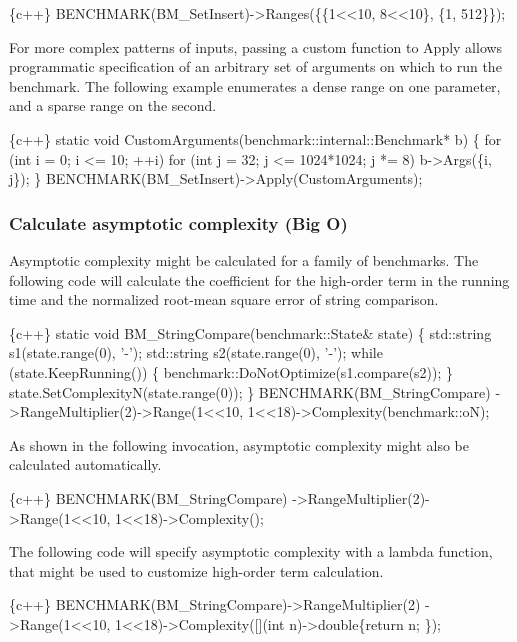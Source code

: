 \begin{DoxyCode}
\{c++\}
BENCHMARK(BM\_SetInsert)->Ranges(\{\{1<<10, 8<<10\}, \{1, 512\}\});
\end{DoxyCode}


For more complex patterns of inputs, passing a custom function to {\ttfamily Apply} allows programmatic specification of an arbitrary set of arguments on which to run the benchmark. The following example enumerates a dense range on one parameter, and a sparse range on the second.


\begin{DoxyCode}
\{c++\}
static void CustomArguments(benchmark::internal::Benchmark* b) \{
  for (int i = 0; i <= 10; ++i)
    for (int j = 32; j <= 1024*1024; j *= 8)
      b->Args(\{i, j\});
\}
BENCHMARK(BM\_SetInsert)->Apply(CustomArguments);
\end{DoxyCode}


\subsubsection*{Calculate asymptotic complexity (Big O)}

Asymptotic complexity might be calculated for a family of benchmarks. The following code will calculate the coefficient for the high-\/order term in the running time and the normalized root-\/mean square error of string comparison.


\begin{DoxyCode}
\{c++\}
static void BM\_StringCompare(benchmark::State& state) \{
  std::string s1(state.range(0), '-');
  std::string s2(state.range(0), '-');
  while (state.KeepRunning()) \{
    benchmark::DoNotOptimize(s1.compare(s2));
  \}
  state.SetComplexityN(state.range(0));
\}
BENCHMARK(BM\_StringCompare)
    ->RangeMultiplier(2)->Range(1<<10, 1<<18)->Complexity(benchmark::oN);
\end{DoxyCode}


As shown in the following invocation, asymptotic complexity might also be calculated automatically.


\begin{DoxyCode}
\{c++\}
BENCHMARK(BM\_StringCompare)
    ->RangeMultiplier(2)->Range(1<<10, 1<<18)->Complexity();
\end{DoxyCode}


The following code will specify asymptotic complexity with a lambda function, that might be used to customize high-\/order term calculation.


\begin{DoxyCode}
\{c++\}
BENCHMARK(BM\_StringCompare)->RangeMultiplier(2)
    ->Range(1<<10, 1<<18)->Complexity([](int n)->double\{return n; \});
\end{DoxyCode}


